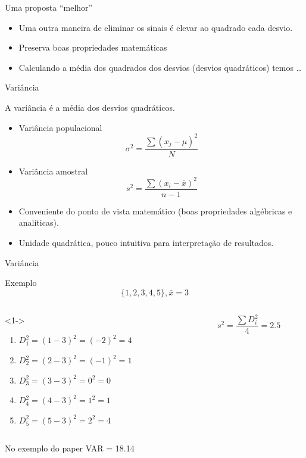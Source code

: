 \documentclass{beamer}
\begin{document}
\begin{frame}{Uma proposta ``melhor''}
  \begin{itemize}
  \item Uma outra maneira de eliminar os sinais é elevar ao quadrado
    cada desvio.
  \item Preserva boas propriedades matemáticas
  \item Calculando a média dos quadrados dos desvios (desvios
    quadráticos) temos \ldots
  \end{itemize}
\end{frame}

\begin{frame}{Variância}
  \begin{definition}
    A variância é a média dos desvios quadráticos.
  \end{definition}
  \begin{itemize}
  \item Variância populacional
$$\sigma^2 = \frac{\sum (x_j - \mu)^2}{N}$$
\item Variância amostral
$$s^2 = \frac{\sum (x_i - \bar{x})^2}{n-1}$$
\item Conveniente do ponto de vista matemático (boas propriedades
  algébricas e analíticas).
\item Unidade quadrática, pouco intuitiva para interpretação de
  resultados.
  \end{itemize}
\end{frame}

\begin{frame}{Variância}
  \begin{exampleblock}{Exemplo}
      \begin{displaymath}
    \{1,2,3,4,5\}, \bar{x} = 3
  \end{displaymath}
  \begin{columns}
    \begin{column}{6cm}<1->
      \begin{enumerate}
      \item $D_1^2 = (1-3)^2 = (-2)^2 = 4$
      \item $D_2^2 = (2-3)^2 = (-1)^2 = 1$
      \item $D_3^2 = (3-3)^2 = 0^2 =0$
      \item $D_4^2 = (4-3)^2 = 1^2 = 1$
      \item $D_5^2 = (5-3)^2 = 2^2 = 4 $
      \end{enumerate}
    \end{column}
    \begin{column}{4cm}
      \begin{displaymath}
        s^2 = \frac{\sum D_i^2}{4} = 2.5
      \end{displaymath}
    \end{column}
  \end{columns}
  \end{exampleblock}
  \begin{block}{No exemplo do paper}
    VAR = 18.14
  \end{block}
\end{frame}
\end{document}
